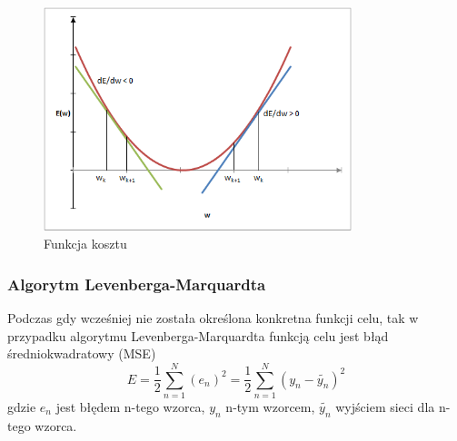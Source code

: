 \begin{figure}
	\centering
	\includegraphics[width=0.8\textwidth]{images/gradient.png}
	\caption{Funkcja kosztu}
	\label{fig:gradient}
\end{figure}

\subsubsection*{Algorytm Levenberga-Marquardta}
Podczas gdy wcześniej nie została określona konkretna funkcji celu, tak w przypadku algorytmu Levenberga-Marquardta funkcją celu jest błąd średniokwadratowy (MSE)\cite{Bishop}
\begin{equation}
	\label{wzor:mse}
	E = \frac{1}{2} \sum_{n=1}^N(e_n)^2 = \frac{1}{2} \sum_{n=1}^N(y_n - \tilde{y_n})^2
\end{equation}
gdzie $e_n$ jest błędem n-tego wzorca, $y_n$ n-tym wzorcem, $\tilde{y_n}$ wyjściem sieci dla n-tego wzorca.

